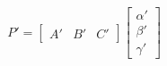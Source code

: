 \documentclass{article}
\begin{document}
\thispagestyle{empty}

$$
P' = \begin{bmatrix}A' & B' & C'\end{bmatrix} \begin{bmatrix}\alpha'\\ \beta'\\ \gamma'\end{bmatrix}
$$
\end{document}
